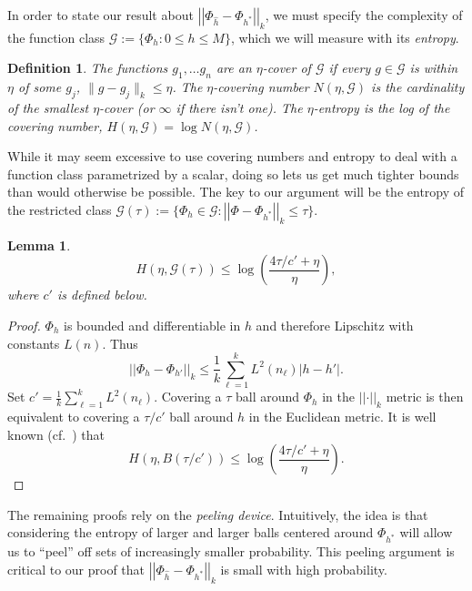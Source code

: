 \documentclass[11pt]{article}
\newtheorem{definition}[theorem]{Definition}
\newtheorem{lemma}[theorem]{Lemma}
\newcommand{\vnorm}[1]{\left|\left| #1 \right|\right|}
\begin{document}
In order to state our result about $\vnorm{\Phi_{\widehat{h}} - \Phi_{h^*}}_k$,
we must specify the complexity of the function class $\mathcal{G} :=\{ \Phi_h :
0 \leq h \leq M\}$, which we will measure with its \emph{entropy}.
\begin{definition}
  The functions $g_1, \ldots g_n$ are an {\em $\eta$-cover} of $\mathcal{G}$ if
  every $g \in \mathcal{G}$ is within $\eta$ of some $g_j$, $\|g-g_j\|_k \leq
  \eta$.  The {\em $\eta$-covering number} $N(\eta,\mathcal{G})$ is the
  cardinality of the smallest $\eta$-cover (or $\infty$ if there isn't one).
  The {\em $\eta$-entropy} is the log of the covering number,
  $H(\eta,\mathcal{G}) = \log N(\eta,\mathcal{G})$.
\end{definition}
While it may seem excessive to use covering numbers and entropy to deal with a
function class parametrized by a scalar, doing so lets us get much tighter
bounds than would otherwise be possible. The key to our argument will be the
entropy of the restricted class $\mathcal{G}(\tau) := \{\Phi_h \in \mathcal{G}
: \vnorm{\Phi-\Phi_{h^*}}_k \leq \tau\}$.
\begin{lemma}
  \label{lem:covnum}
  \begin{equation*}
    H(\eta,\mathcal{G}(\tau))
    \leq \log\left(\frac{4\tau/c'+\eta}{\eta}\right),\label{eq:11}
  \end{equation*}
  where $c'$ is defined below.
\end{lemma}
\begin{proof}
  $\Phi_h$ is bounded and differentiable in $h$ and therefore Lipschitz with
  constants $L(n)$. Thus
  \begin{equation*}
    \label{eq:13}
    \vnorm{\Phi_h - \Phi_{h'}}_k \leq \frac{1}{k}\sum_{\ell=1}^k
    L^2(n_\ell) |h-h'|.
  \end{equation*}
  Set $c'=\frac{1}{k}\sum_{\ell=1}^k{L^2(n_\ell)}$.  Covering a $\tau$ ball
  around $\Phi_h$ in the $\vnorm{\cdot}_k$ metric is then equivalent to
  covering a $\tau/c'$ ball around $h$ in the Euclidean metric. It is well
  known (cf.~\citep{Geer2000}) that
  \begin{equation*}
    \label{eq:14}
    H(\eta, B(\tau/c')) \leq \log\left(\frac{4\tau/c' + \eta}{\eta}\right).
  \end{equation*}
\end{proof}
The remaining proofs rely on the \emph{peeling device}. Intuitively, the idea
is that considering the entropy of larger and larger balls centered around
$\Phi_{h^*}$ will allow us to ``peel'' off sets of increasingly smaller
probability. This peeling argument is critical to our proof that
$\vnorm{\Phi_{\widehat{h}}- \Phi_{h^*}}_k$ is small with high probability.
\end{document}
